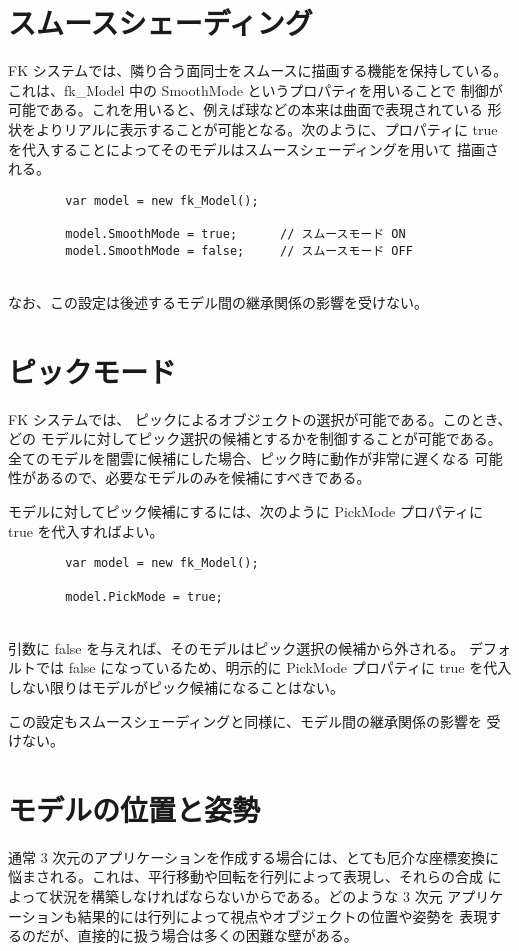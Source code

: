 \section{スムースシェーディング} \label{sec:smooth}
FK システムでは、隣り合う面同士をスムースに描画する機能を保持している。
これは、fk\_Model 中の SmoothMode というプロパティを用いることで
制御が可能である。これを用いると、例えば球などの本来は曲面で表現されている
形状をよりリアルに表示することが可能となる。次のように、プロパティに
true を代入することによってそのモデルはスムースシェーディングを用いて
描画される。
\\
\begin{screen}
\begin{verbatim}
        var model = new fk_Model();

        model.SmoothMode = true;      // スムースモード ON
        model.SmoothMode = false;     // スムースモード OFF
\end{verbatim}
\end{screen}
~ \\
なお、この設定は後述するモデル間の継承関係の影響を受けない。
\section{ピックモード}
FK システムでは、
ピックによるオブジェクトの選択が可能である。このとき、どの
モデルに対してピック選択の候補とするかを制御することが可能である。
全てのモデルを闇雲に候補にした場合、ピック時に動作が非常に遅くなる
可能性があるので、必要なモデルのみを候補にすべきである。

モデルに対してピック候補にするには、次のように PickMode プロパティに
true を代入すればよい。
\\
\begin{screen}
\begin{verbatim}
        var model = new fk_Model();

        model.PickMode = true;
\end{verbatim}
\end{screen}
~ \\
引数に false を与えれば、そのモデルはピック選択の候補から外される。
デフォルトでは false になっているため、明示的に PickMode プロパティに
true を代入しない限りはモデルがピック候補になることはない。

この設定もスムースシェーディングと同様に、モデル間の継承関係の影響を
受けない。
\section{モデルの位置と姿勢}
通常 3 次元のアプリケーションを作成する場合には、とても厄介な座標変換に
悩まされる。これは、平行移動や回転を行列によって表現し、それらの合成
によって状況を構築しなければならないからである。どのような 3 次元
アプリケーションも結果的には行列によって視点やオブジェクトの位置や姿勢を
表現するのだが、直接的に扱う場合は多くの困難な壁がある。

